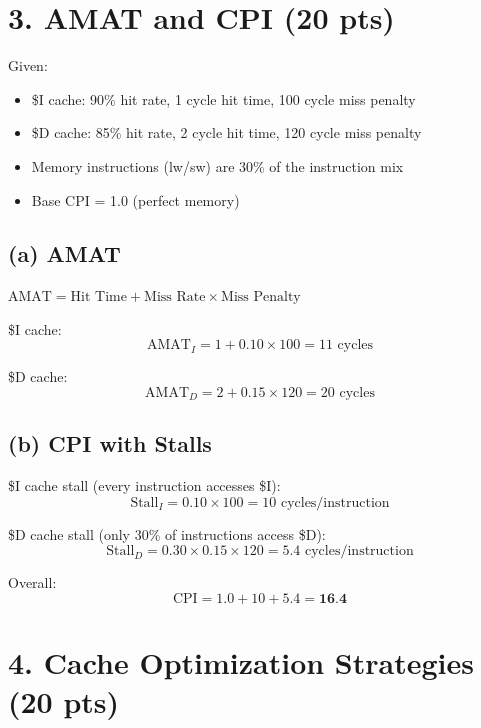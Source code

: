 \documentclass[11pt]{article}
\begin{document}
\newpage
\section*{3. AMAT and CPI (20 pts)}

Given:
\begin{itemize}[nosep]
  \item \$I cache: 90\% hit rate, 1 cycle hit time, 100 cycle miss penalty
  \item \$D cache: 85\% hit rate, 2 cycle hit time, 120 cycle miss penalty
  \item Memory instructions (lw/sw) are 30\% of the instruction mix
  \item Base CPI = 1.0 (perfect memory)
\end{itemize}

\subsection*{(a) AMAT}

$\text{AMAT} = \text{Hit Time} + \text{Miss Rate} \times \text{Miss Penalty}$

\medskip
\$I cache:
\[
\text{AMAT}_I = 1 + 0.10 \times 100 = 11 \text{ cycles}
\]

\$D cache:
\[
\text{AMAT}_D = 2 + 0.15 \times 120 = 20 \text{ cycles}
\]

\subsection*{(b) CPI with Stalls}

\$I cache stall (every instruction accesses \$I):
\[
\text{Stall}_I = 0.10 \times 100 = 10 \text{ cycles/instruction}
\]

\$D cache stall (only 30\% of instructions access \$D):
\[
\text{Stall}_D = 0.30 \times 0.15 \times 120 = 5.4 \text{ cycles/instruction}
\]

Overall:
\[
\text{CPI} = 1.0 + 10 + 5.4 = \textbf{16.4}
\]

\newpage
\section*{4. Cache Optimization Strategies (20 pts)}
\end{document}

